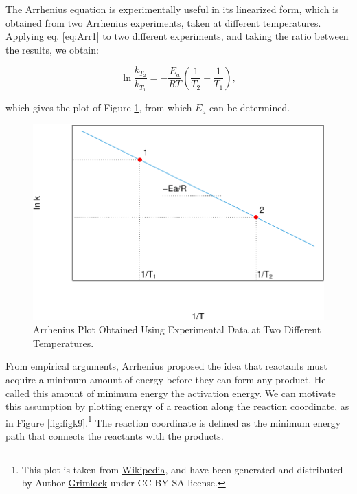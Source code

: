 \documentclass[
  9pt,
]{extbook}
\theoremstyle{definition}
\theoremstyle{definition}
\theoremstyle{definition}
\theoremstyle{remark}
\begin{document}
The Arrhenius equation is experimentally useful in its linearized form, which is obtained from two Arrhenius experiments, taken at different temperatures. Applying eq. \eqref{eq:Arr1} to two different experiments, and taking the ratio between the results, we obtain:

\begin{equation}
\ln \frac{k_{T_2}}{k_{T_1}}=-\frac{E_a}{RT}\left(\frac{1}{T_2}-\frac{1}{T_1}\right),
\label{eq:Arr2}
\end{equation}

which gives the plot of Figure \ref{fig:figk8}, from which \(E_a\) can be determined.

\begin{figure}

{\centering \includegraphics{pchem1_files/figure-latex/figk8-1} 

}

\caption{Arrhenius Plot Obtained Using Experimental Data at Two Different Temperatures.}\label{fig:figk8}
\end{figure}

From empirical arguments, Arrhenius proposed the idea that reactants must acquire a minimum amount of energy before they can form any product. He called this amount of minimum energy the activation energy. We can motivate this assumption by plotting energy of a reaction along the reaction coordinate, as in Figure \ref{fig:figk9}.\footnote{This plot is taken from \href{https://en.wikipedia.org/wiki/Transition_state_theory}{Wikipedia}, and have been generated and distributed by Author \href{https://commons.wikimedia.org/wiki/User:Grimlock}{Grimlock} under CC-BY-SA license.} The reaction coordinate is defined as the minimum energy path that connects the reactants with the products.
\end{document}

